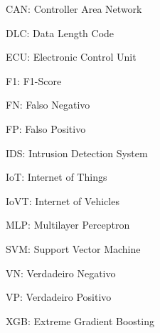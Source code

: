 \begin{siglas}
    \item CAN: Controller Area Network
    \item DLC: Data Length Code
    \item ECU: Electronic Control Unit
    \item F1: F1-Score
    \item FN: Falso Negativo
    \item FP: Falso Positivo
    \item IDS: Intrusion Detection System
    \item IoT: Internet of Things
    \item IoVT: Internet of Vehicles
    \item MLP: Multilayer Perceptron
    \item SVM: Support Vector Machine
    \item VN: Verdadeiro Negativo
    \item VP: Verdadeiro Positivo
    \item XGB: Extreme Gradient Boosting
\end{siglas}






